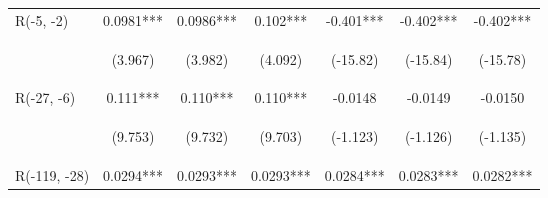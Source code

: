 \documentclass[]{article}
\begin{document}
\begin{center}
\begin{tabular}{lcccccc}
        R(-5, -2)        & 0.0981***                                      & 0.0986***                                      & 0.102***                                       & -0.401***                                       & -0.402***                                      & -0.402***                                      \\
        \vspace{4pt}     & \begin{footnotesize}(3.967)\end{footnotesize}  & \begin{footnotesize}(3.982)\end{footnotesize}  & \begin{footnotesize}(4.092)\end{footnotesize}  & \begin{footnotesize}(-15.82)\end{footnotesize}  & \begin{footnotesize}(-15.84)\end{footnotesize} & \begin{footnotesize}(-15.78)\end{footnotesize} \\
        R(-27, -6)       & 0.111***                                       & 0.110***                                       & 0.110***                                       & -0.0148                                         & -0.0149                                        & -0.0150                                        \\
        \vspace{4pt}     & \begin{footnotesize}(9.753)\end{footnotesize}  & \begin{footnotesize}(9.732)\end{footnotesize}  & \begin{footnotesize}(9.703)\end{footnotesize}  & \begin{footnotesize}(-1.123)\end{footnotesize}  & \begin{footnotesize}(-1.126)\end{footnotesize} & \begin{footnotesize}(-1.135)\end{footnotesize} \\
        R(-119, -28)     & 0.0294***                                      & 0.0293***                                      & 0.0293***                                      & 0.0284***                                       & 0.0283***                                      & 0.0282***                                      \\

\end{tabular}
\end{center}
\end{document}
